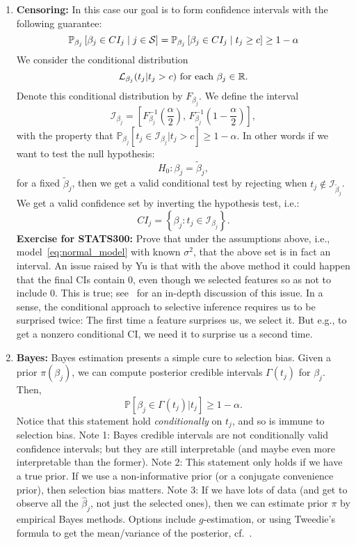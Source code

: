 	\begin{enumerate}
	\item {\bf Censoring:} In this case our goal is to form confidence intervals with the following guarantee:
	$$\PP[\beta_j]{ \beta_j \in  CI_j  \mid j \in \mathcal{S}}  = \PP[\beta_j]{ \beta_j \in  CI_j  \mid t_j \geq c}  \geq 1-\alpha$$
	We consider the conditional distribution
	$$ \mathcal L_{\beta_j}(t_j | t_j > c) \text{ for each } \beta_j \in \RR. $$
	Denote this conditional distribution by $F_{\beta_j}$. We define the interval
	$$ \mathcal I_{\beta_j} = \left[F_{\beta_j}^{-1}\left(\frac{\alpha}{2}\right), \, F_{\beta_j}^{-1}\left(1 - \frac{\alpha}{2}\right)\right], $$
	with the property that $\mathbb P_{\beta_j}[{t_j \in \mathcal I_{\beta_j} | t_j > c}] \geq 1 - \alpha$. In other words if we want to test the null hypothesis:
	$$ H_0: \beta_j = \tilde{\beta}_j,$$ 
	for a fixed $\tilde{\beta}_j$, then we get a valid conditional test by rejecting when $t_j \notin \mathcal I_{\tilde{\beta}_j}$. We get a valid confidence set by inverting the hypothesis test, i.e.:
	$$ CI_j = \left\{\beta_j : t_j \in \mathcal I_{\beta_j}\right\}. $$
	\textbf{Exercise for STATS300:} Prove that under the assumptions above, i.e., model~\eqref{eq:normal_model} with known $\sigma^2$, that the above set is in fact an interval.
	An issue raised by Yu is that with the above method it could happen that the final CIs contain $0$, even though we selected features so as not to include $0$. This is true; see~\citet*{weinstein2013selection} for an in-depth discussion of this issue. In a sense, the conditional approach to selective inference requires us to be surprised twice: The first time a feature surprises us, we select it. But e.g., to get a nonzero conditional CI, we need it to surprise us a second time.

	\item {\bf Bayes:} Bayes estimation presents a simple cure to selection bias. Given a prior $\pi(\beta_j)$, we can compute posterior credible intervals $\Gamma(t_j)$ for $\beta_j$. Then,
	$$ \mathbb P [{\beta_j \in \Gamma(t_j) | t_j}] \geq 1 - \alpha. $$
	Notice that this statement hold \emph{conditionally} on $t_j$, and so is immune to selection bias. Note 1: Bayes credible intervals are not conditionally valid confidence intervals; but they are still interpretable (and maybe even more interpretable than the former). Note 2: This statement only holds if we have a true prior. If we use a non-informative prior (or a conjugate convenience prior), then selection bias matters. Note 3: If we have lots of data (and get to observe all the $\hat \beta_j$, not just the selected ones), then we can estimate prior $\pi$ by empirical Bayes methods. Options include $g$-estimation, or using Tweedie's formula to get the mean/variance of the posterior, cf.~\citet{efron2011tweedie}.


\end{enumerate}
